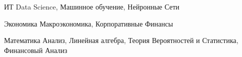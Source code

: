 
\begin{cvskills}

  \cvskill
    {ИТ} %
    {Data Science, Машинное обучение, Нейронные Сети} %
    
  \cvskill
    {Экономика} %
    {Макроэкономика, Корпоративные Финансы} %
    
  \cvskill
    {Математика} %
    {Анализ, Линейная алгебра, Теория Вероятностей и Статистика, Финансовый Анализ} %
    
\end{cvskills}
